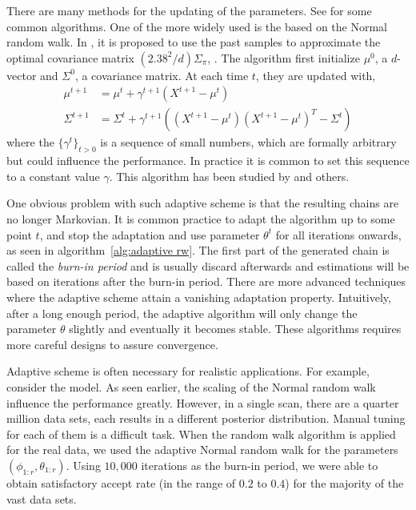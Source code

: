 There are many methods for the updating of the parameters. See
\cite{Andrieu:2008kh} for some common algorithms. One of the more widely used
is the based on the Normal random walk. In \cite{Haario:1999dh,Haario:2001gu},
it is proposed to use the past samples to approximate the optimal covariance
matrix $(2.38^2/d)\Sigma_{\pi}$, \cite{Gelman:1995vx}. The algorithm first
initialize $\mu^0$, a $d$-vector and $\Sigma^0$, a covariance matrix. At each
time $t$, they are updated with,
\begin{align}
  \mu^{t+1} &= \mu^t + \gamma^{t+1} (X^{t+1} - \mu^t) \\
  \Sigma^{t+1} &= \Sigma^t + \gamma^{t+1}((X^{t+1} - \mu^t)(X^{t+1} - \mu^t)^T
  - \Sigma^t)
\end{align}
where the $\{\gamma^t\}_{t>0}$ is a sequence of small numbers, which are
formally arbitrary but could influence the performance. In practice it is
common to set this sequence to a constant value $\gamma$. This algorithm has
been studied by \cite{Andrieu:2006tw} and others.

One obvious problem with such adaptive scheme is that the resulting chains are
no longer Markovian. It is common practice to adapt the algorithm up to some
point $t$, and stop the adaptation and use parameter $\theta^t$ for all
iterations onwards, as seen in algorithm~\ref{alg:adaptive rw}. The first part
of the generated chain is called the \emph{burn-in period} and is usually
discard afterwards and estimations will be based on iterations after the
burn-in period. There are more advanced techniques where the adaptive scheme
attain a vanishing adaptation property. Intuitively, after a long enough
period, the adaptive algorithm will only change the parameter $\theta$
slightly and eventually it becomes stable. These algorithms requires more
careful designs to assure convergence.

Adaptive scheme is often necessary for realistic applications. For example,
consider the \pet model. As seen earlier, the scaling of the Normal random
walk influence the performance greatly. However, in a single \pet scan, there
are a quarter million data sets, each results in a different posterior
distribution. Manual tuning for each of them is a difficult task. When the
random walk algorithm is applied for the real data, we used the adaptive
Normal random walk for the parameters $(\phi_{1:r},\theta_{1:r})$. Using
$10,000$ iterations as the burn-in period, we were able to obtain satisfactory
accept rate (in the range of $0.2$ to $0.4$) for the majority of the vast data
sets.

